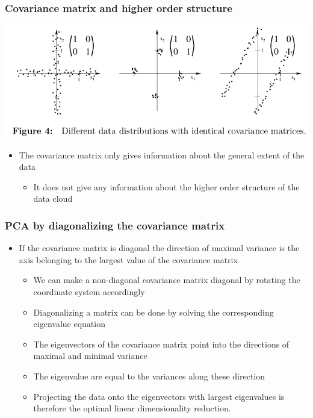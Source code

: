 \documentclass[11pt]{article}
\begin{document}
\subsubsection{Covariance matrix and higher order structure}
\label{sec:orge648157}
\begin{center}
\includegraphics[width=.9\linewidth]{Principal Component Analysis/screenshot_2018-11-20_20-38-39.png}
\end{center}
\begin{itemize}
\item The covariance matrix only gives information about the general extent of the data
\begin{itemize}
\item It does not give any information about the higher order structure of the data cloud
\end{itemize}
\end{itemize}

\subsubsection{PCA by diagonalizing the covariance matrix}
\label{sec:org293ae29}
\begin{itemize}
\item If the covariance matrix is diagonal the direction of maximal variance is the axis belonging to the largest value of the covariance matrix
\begin{itemize}
\item We can make a non-diagonal covariance matrix diagonal by rotating the coordinate system accordingly
\item Diagonalizing a matrix can be done by solving the corresponding eigenvalue equation
\item The eigenvectors of the covariance matrix point into the directions of maximal and minimal variance
\item The eigenvalue are equal to the variances along these direction
\item Projecting the data onto the eigenvectors with largest eigenvalues is therefore the optimal linear dimensionality reduction.
\end{itemize}
\end{itemize}
\end{document}
